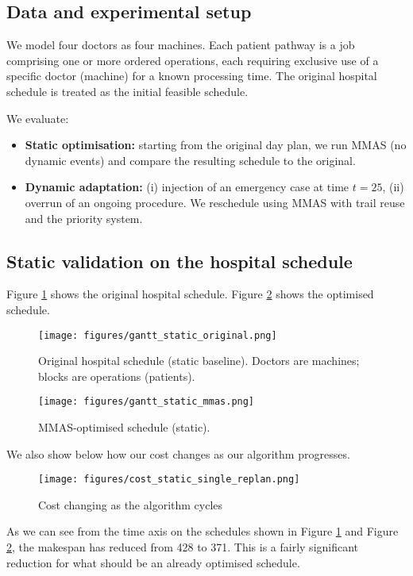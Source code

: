 \documentclass[final-report]{report-template}
\begin{document}
\subsection{Data and experimental setup}
We model four doctors as four machines. Each patient pathway is a job comprising one or more ordered operations, each requiring exclusive use of a specific doctor (machine) for a known processing time. The original hospital schedule is treated as the initial feasible schedule.

We evaluate:
\begin{itemize}
  \item \textbf{Static optimisation:} starting from the original day plan, we run MMAS (no dynamic events) and compare the resulting schedule to the original.
  \item \textbf{Dynamic adaptation:} (i) injection of an emergency case at time $t{=}25$, (ii) overrun of an ongoing procedure. We reschedule using MMAS with trail reuse and the priority system.
\end{itemize}

\subsection{Static validation on the hospital schedule}
Figure \ref{fig:gantt-static-original} shows the original hospital schedule. Figure \ref{fig:gantt-static-mmas} shows the optimised schedule.

\begin{figure}[H]
  \centering
  \texttt{[image: figures/gantt\_static\_original.png]}
  \caption{Original hospital schedule (static baseline). Doctors are machines; blocks are operations (patients).}
  \label{fig:gantt-static-original}
\end{figure}

\begin{figure}[H]
  \centering
  \texttt{[image: figures/gantt\_static\_mmas.png]}
  \caption{MMAS-optimised schedule (static).}
  \label{fig:gantt-static-mmas}
\end{figure}

We also show below how our cost changes as our algorithm progresses.
\begin{figure}[H]
  \centering
  \texttt{[image: figures/cost\_static\_single\_replan.png]}
  \caption{Cost changing as the algorithm cycles}
  \label{fig:cost-static-mmas}
\end{figure}
As we can see from the time axis on the schedules shown in Figure \ref{fig:gantt-static-original} and Figure \ref{fig:gantt-static-mmas}, the makespan has reduced from 428 to 371. This is a fairly significant reduction for what should be an already optimised schedule.
\end{document}
